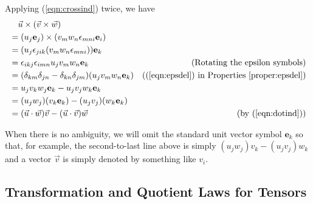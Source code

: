 \begin{solution}
Applying (\ref{eqn:crossind}) twice, we have
\begin{align*}
&\quad \vec{u} \times (\vec{v} \times \vec{w}) \\
&= (u_j\textbf{e}_j) \times (v_mw_n\epsilon_{mni}\textbf{e}_i) \\
&= (u_j\epsilon_{jik}(v_mw_n\epsilon_{mni})) \textbf{e}_k \\
&= \epsilon_{ikj}\epsilon_{imn}u_jv_mw_n \textbf{e}_k &\text{(Rotating the epsilon symbols)} \\
&= (\delta_{km}\delta_{jn} - \delta_{kn}\delta_{jm})(u_jv_mw_n \textbf{e}_k) & \text{((\ref{eqn:epsdel}) in Properties \ref{proper:epsdel})} \\
&= u_jv_kw_j \textbf{e}_k - u_jv_jw_k \textbf{e}_k \\
&= (u_jw_j)(v_k\textbf{e}_k) - (u_jv_j)(w_k \textbf{e}_k) \\
&= (\vec{u} \cdot \vec{w})\vec{v} - (\vec{u} \cdot \vec{v})\vec{w} & \text{(by (\ref{eqn:dotind}))}
\end{align*}
\end{solution}
When there is no ambiguity, we will omit the standard unit vector symbol $\textbf{e}_k$ so that, for example, the second-to-last line above is simply $(u_jw_j)v_k - (u_jv_j)w_k$ and a vector $\vec{v}$ is simply denoted by something like $v_i$.

\subsection{Transformation and Quotient Laws for Tensors}

